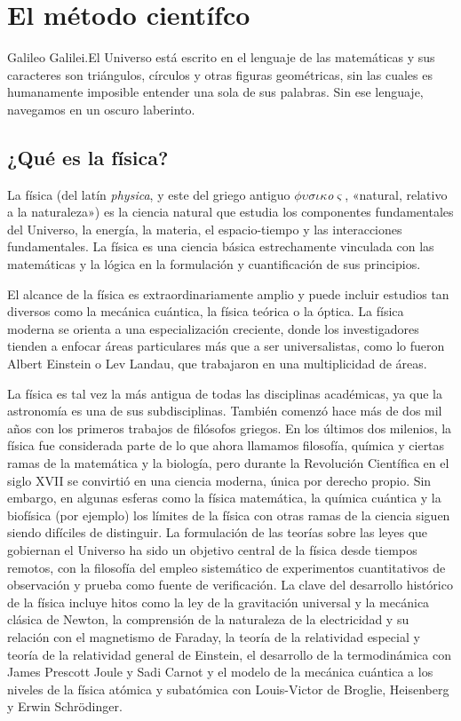 \chapter{El método científco}

\begin{cita}{Galileo Galilei.}El Universo está escrito en el lenguaje de las matemáticas y sus caracteres son triángulos, círculos y otras figuras geométricas, sin las cuales es humanamente imposible entender una sola de sus palabras. Sin ese lenguaje, navegamos en un oscuro laberinto.
\end{cita}

\section{¿Qué es la física?}
 
La física (del latín \textit{physica}, y este del griego antiguo \textit{$\phi$$\upsilon$$\sigma$$\iota$$\kappa$o$\varsigma$}, «natural, relativo a la naturaleza») es la ciencia natural que estudia los componentes fundamentales del Universo, la energía, la materia, el espacio-tiempo y las interacciones fundamentales. La física es una ciencia básica estrechamente vinculada con las matemáticas y la lógica en la formulación y cuantificación de sus principios. 

El alcance de la física es extraordinariamente amplio y puede incluir estudios tan diversos como la mecánica cuántica, la física teórica o la óptica. La física moderna se orienta a una especialización creciente, donde los investigadores tienden a enfocar áreas particulares más que a ser universalistas, como lo fueron Albert Einstein o Lev Landau, que trabajaron en una multiplicidad de áreas.

La física es tal vez la más antigua de todas las disciplinas académicas, ya que la astronomía es una de sus subdisciplinas. También comenzó hace más de dos mil años con los primeros trabajos de filósofos griegos. En los últimos dos milenios, la física fue considerada parte de lo que ahora llamamos filosofía, química y ciertas ramas de la matemática y la biología, pero durante la Revolución Científica en el siglo XVII se convirtió en una ciencia moderna, única por derecho propio. Sin embargo, en algunas esferas como la física matemática, la química cuántica y la biofísica (por ejemplo) los límites de la física con otras ramas de la ciencia siguen siendo difíciles de distinguir. La formulación de las teorías sobre las leyes que gobiernan el Universo ha sido un objetivo central de la física desde tiempos remotos, con la filosofía del empleo sistemático de experimentos cuantitativos de observación y prueba como fuente de verificación. La clave del desarrollo histórico de la física incluye hitos como la ley de la gravitación universal y la mecánica clásica de Newton, la comprensión de la naturaleza de la electricidad y su relación con el magnetismo de Faraday, la teoría de la relatividad especial y teoría de la relatividad general de Einstein, el desarrollo de la termodinámica con James Prescott Joule y Sadi Carnot y el modelo de la mecánica cuántica a los niveles de la física atómica y subatómica con Louis-Victor de Broglie, Heisenberg y Erwin Schrödinger. 

